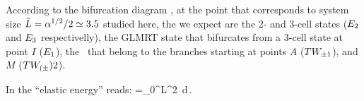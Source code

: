 
According to the bifurcation diagram 
, 
at the point that corresponds to system size $\tilde{L}=\alpha^{1/2}/2\simeq3.5$
studied here,
the {\eqva} we expect are the $2$- and $3$-cell states ($E_{2}$ and $E_{3}$ respectivelly), the GLMRT state that bifurcates from a $3$-cell state at point $I$ ($E_{1}$),
the \reqva\ that belong to the branches starting at points $A$ ($TW_{\pm1}$),
and $M$ ($TW_{(\pm}){2}$).


In  
the ``elastic energy'' reads:
\beq
    =\int_0^{L}^2\, d\,.
\eeq




